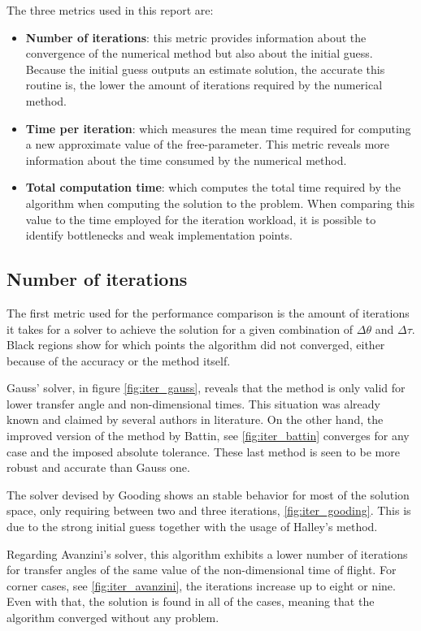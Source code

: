The three metrics used in this report are:

\begin{itemize}
  \item \textbf{Number of iterations}: this metric provides information about
        the convergence of the numerical method but also about the initial
        guess. Because the initial guess outputs an estimate solution, the
        accurate this routine is, the lower the amount of iterations required
        by the numerical method.
  \item \textbf{Time per iteration}: which measures the mean time required for
        computing a new approximate value of the free-parameter. This metric
        reveals more information about the time consumed by the numerical
        method.
  \item \textbf{Total computation time}: which computes the total time required
	by the algorithm when computing the solution to the problem. When
	comparing this value to the time employed for the iteration workload, it
	is possible to identify bottlenecks and weak implementation points.
\end{itemize}

\subsection{Number of iterations}

The first metric used for the performance comparison is the amount of iterations
it takes for a solver to achieve the solution for a given combination of $\Delta
  \theta$ and $\Delta \tau$. Black regions show for which points the algorithm did
not converged, either because of the accuracy or the method itself.

Gauss' solver, in figure \ref{fig:iter_gauss}, reveals that the method is only
valid for lower transfer angle and non-dimensional times. This situation was
already known and claimed by several authors in literature. On the other hand,
the improved version of the method by Battin, see \ref{fig:iter_battin}
converges for any case and the imposed absolute tolerance. These last method is
seen to be more robust and accurate than Gauss one.

The solver devised by Gooding shows an stable behavior for most of the solution
space, only requiring between two and three iterations, \ref{fig:iter_gooding}.
This is due to the strong initial guess together with the usage of Halley's
method.

Regarding Avanzini's solver, this algorithm exhibits a lower number of
iterations for transfer angles of the same value of the non-dimensional time of
flight. For corner cases, see \ref{fig:iter_avanzini}, the iterations increase up
to eight or nine. Even with that, the solution is found in all of the cases,
meaning that the algorithm converged without any problem.

